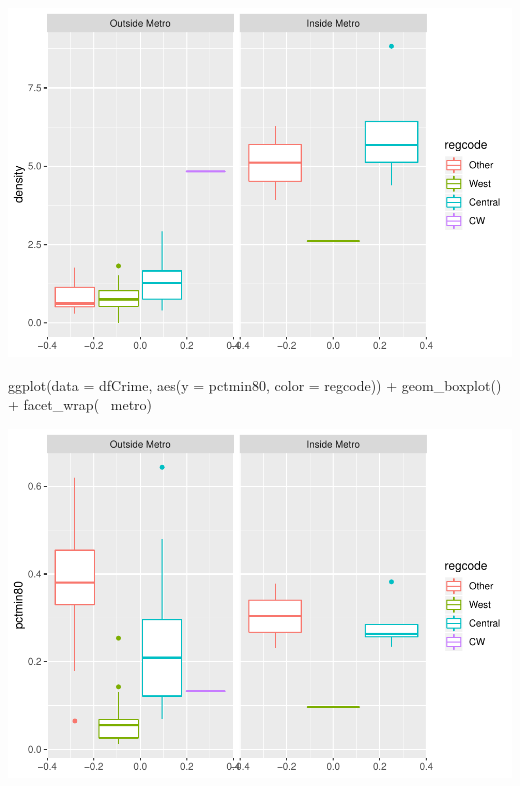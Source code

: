 \documentclass[]{article}
\newenvironment{Shaded}{}{}
\newcommand{\DataTypeTok}[1]{#1}
\newcommand{\KeywordTok}[1]{\textcolor[rgb]{0.00,0.00,1.00}{#1}}
\newcommand{\NormalTok}[1]{#1}
\newcommand{\OperatorTok}[1]{#1}
\newcommand{\StringTok}[1]{\textcolor[rgb]{0.00,0.50,0.50}{#1}}
\begin{document}
\includegraphics{Bagnard_Gaustad_Hartman_Leung_Lab_3_files/figure-latex/unnamed-chunk-27-1.pdf}

\begin{Shaded}
\begin{Highlighting}[]
\KeywordTok{ggplot}\NormalTok{(}\DataTypeTok{data =}\NormalTok{ dfCrime, }\KeywordTok{aes}\NormalTok{(}\DataTypeTok{y =}\NormalTok{ pctmin80, }\DataTypeTok{color =}\NormalTok{ regcode)) }\OperatorTok{+}
\StringTok{      }\KeywordTok{geom_boxplot}\NormalTok{() }\OperatorTok{+}\StringTok{ }\KeywordTok{facet_wrap}\NormalTok{(}\OperatorTok{~}\StringTok{ }\NormalTok{metro)}
\end{Highlighting}
\end{Shaded}

\includegraphics{Bagnard_Gaustad_Hartman_Leung_Lab_3_files/figure-latex/unnamed-chunk-27-2.pdf}
\end{document}
